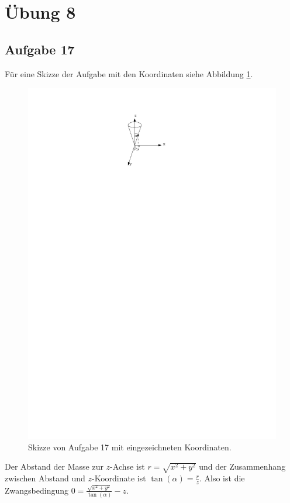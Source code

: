 \chapter*{Übung 8}

\section*{Aufgabe 17}

Für eine Skizze der Aufgabe mit den Koordinaten siehe Abbildung \ref{fig:ueb8_aufgabe17}.

\begin{figure}[h]
	\centering
	\includegraphics{figures/ueb8/aufgabe17}
	\caption{Skizze von Aufgabe 17 mit eingezeichneten Koordinaten.}
	\label{fig:ueb8_aufgabe17}
\end{figure}

Der Abstand der Masse zur $z$-Achse ist $r = \sqrt{x^2 + y^2}$ und der Zusammenhang zwischen Abstand und $z$-Koordinate ist $\tan(\alpha) = \frac{r}{z}$. Also ist die Zwangsbedingung $0 = \frac{\sqrt{x^2 + y^2}}{\tan(\alpha)} - z$.

